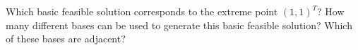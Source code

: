 Which basic feasible solution corresponds to the extreme point $(1, 1)^T$? How many different bases can be used to 
generate this basic feasible solution? Which of these bases are adjacent?

\begin{solution}
  \ \\
\end{solution}